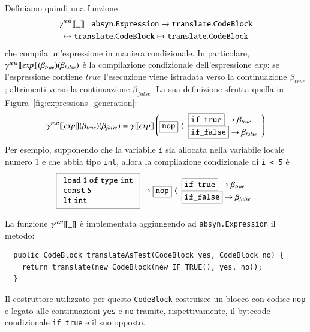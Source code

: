 Definiamo quindi una funzione
%
\begin{multline*}
  {\gamma^{\mathit{test}}[\![{\_}]\!]}{}{}:\mathtt{absyn.Expression}\to
    \mathtt{translate.CodeBlock}\\
  \mapsto\mathtt{translate.CodeBlock}
    \mapsto\mathtt{translate.CodeBlock}
\end{multline*}
%
che compila un'espressione in maniera condizionale.
In particolare, ${\gamma^{\mathit{test}}[\![{\mathit{exp}}]\!]}(\beta_\mathit{true})
(\beta_\mathit{false})$ \`e la
compilazione condizionale dell'espressione $\mathit{exp}$:
se l'espressione contiene $\mathit{true}$ l'esecuzione
viene istradata verso la continuazione $\beta_\mathit{true}$;
altrimenti verso la continuazione $\beta_\mathit{false}$.
La sua definizione sfrutta quella in Figura~\ref{fig:expressions_generation}:
%
\begin{equation}\label{eq:conditional_compilation}
  {\gamma^{\mathit{test}}[\![{\mathit{exp}}]\!]}(\beta_{\mathit{true}})(\beta_\mathit{false})=
    {\gamma[\![{\mathit{exp}}]\!]}\left(
      \fbox{$\mathtt{nop}$}\,\,\langle
    \begin{array}{l}
        \fbox{$\mathtt{if\_true}$}\to\beta_{\mathit{true}}\\
        \fbox{$\mathtt{if\_false}$}\to\beta_\mathit{false}
    \end{array}
    \right)
\end{equation}
%
Per esempio, supponendo che la variabile $\mathtt{i}$ sia allocata nella
variabile locale numero $1$ e che abbia tipo \texttt{int},
allora la compilazione condizionale di \texttt{i < 5} \`e
%
\[
  \fbox{$
  \begin{array}{l}
    \mathtt{load\ 1\ of\ type\ int}\\
    \mathtt{const\ 5}\\
    \mathtt{lt\ int}
  \end{array}
  $}\to
  \fbox{$\mathtt{nop}$}\,\,\langle
    \begin{array}{l}
        \fbox{$\mathtt{if\_true}$}\to\beta_{\mathit{true}}\\
        \fbox{$\mathtt{if\_false}$}\to\beta_\mathit{false}
    \end{array}
\]

La funzione ${\gamma^{\mathit{test}}[\![{\_}]\!]}$ \`e implementata
aggiungendo ad \texttt{absyn.Expression} il metodo:
%
\begin{verbatim}
  public CodeBlock translateAsTest(CodeBlock yes, CodeBlock no) {
    return translate(new CodeBlock(new IF_TRUE(), yes, no));
  }
\end{verbatim}
%
Il costruttore utilizzato per questo \texttt{CodeBlock} costruisce
un blocco con codice \texttt{nop} e legato alle continuazioni
\texttt{yes} e \texttt{no} tramite, rispettivamente, il bytecode condizionale
\texttt{if\_true} e il suo opposto.

